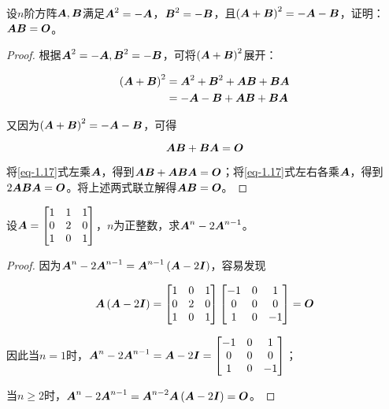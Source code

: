 \begin{problem}\label{problem-1.17}
设\(n\)阶方阵\(\mata,\matb\)满足\(\mata^2=-\mata\)，\(\matb^2=-\matb\)，且\(\spar{\mata+\matb}^2=-\mata-\matb\)，证明：\(\mata\matb=\mato\)。
\end{problem}
\begin{proof}
    根据\(\mata^2=-\mata,\matb^2=-\matb\)，可将\(\spar{\mata+\matb}^2\)展开：

    \begin{align*}
        \spar{\mata+\matb}^2 & =\mata^2+\matb^2+\mata\matb+\matb\mata \\
                             & =-\mata-\matb+\mata\matb+\matb\mata
    \end{align*}

    又因为\(\spar{\mata+\matb}^2=-\mata-\matb\)，可得

    \begin{equation}\label{eq-1.17}
        \mata\matb+\matb\mata=\mato
    \end{equation}

    将\eqref{eq-1.17}式左乘\(\mata\)，得到\(\mata\matb+\mata\matb\mata=\mato\)；将\eqref{eq-1.17}式左右各乘\(\mata\)，得到\(2\mata\matb\mata=\mato\)。将上述两式联立解得\(\mata\matb=\mato\)。
\end{proof}

\begin{problem}\label{problem-1.18}
设\(\mata=\begin{bmatrix}1&1&1\\0&2&0\\1&0&1\end{bmatrix}\)，\(n\)为正整数，求\(\mata^n-2\mata^{n-1}\)。
\end{problem}
\begin{proof}
    因为\(\mata^n-2\mata^{n-1}=\mata^{n-1}\spar{\mata-2\mati}\)，容易发现

    \begin{equation*}
        \mata\spar{\mata-2\mati}=
        \begin{bmatrix}
            1 & 0 & 1 \\0&2&0\\1&0&1
        \end{bmatrix}
        \begin{bmatrix}
            -1 & 0 & 1 \\0&0&0\\1&0&-1
        \end{bmatrix}=\mato
    \end{equation*}

    因此当\(n=1\)时，\(\mata^n-2\mata^{n-1}=\mata-2\mati=\begin{bmatrix}-1 & 0 & 1 \\0&0&0\\1&0&-1\end{bmatrix}\)；

    当\(n\ge2\)时，\(\mata^n-2\mata^{n-1}=\mata^{n-2}\mata\spar{\mata-2\mati}=\mato\)。
\end{proof}

